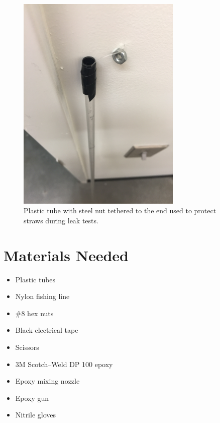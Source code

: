 \documentclass[letterpaper,12pt]{article}
\newenvironment{myitemize} %
{ \begin{itemize}
    \setlength{\itemsep}{4pt}
    \setlength{\parskip}{0pt}
    \setlength{\parsep}{0pt}     }
{ \end{itemize}                  }
\begin{document}
\begin{figure}[ht]
	\centering
	\includegraphics[width=0.7\textwidth, angle=-90]{straw_tube}
	\caption{Plastic tube with steel nut tethered to the end used to protect straws during leak tests.}
	\label{straw tube}
\end{figure}

\newpage

\section{Materials Needed}
	\begin{multicols}{2}
	\begin{myitemize}
		\item Plastic tubes
		\item Nylon fishing line
		\item \#8 hex nuts
		\item Black electrical tape
		\item Scissors
		\item 3M Scotch--Weld DP 100 epoxy
		\item Epoxy mixing nozzle
		\item Epoxy gun
		\item Nitrile gloves	
	\end{myitemize}
	\end{multicols}
	
\end{document}
